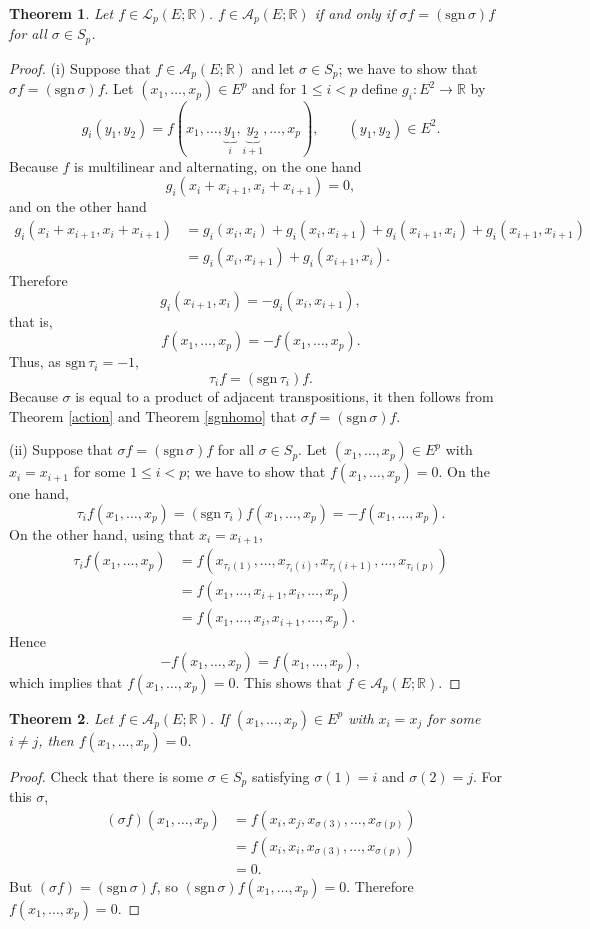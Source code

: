\documentclass{amsart}
\newcommand{\sgn}{\mathrm{sgn}\,}
\newtheorem{theorem}{Theorem}
\theoremstyle{definition}
\begin{document}
\begin{theorem}
Let $f \in \mathscr{L}_p(E;\mathbb{R})$. $f \in \mathscr{A}_p(E;\mathbb{R})$ if and only if $\sigma f = (\sgn \sigma) f$ for all
$\sigma \in S_p$.
\label{sgnalternating}
\end{theorem}
\begin{proof}
(i) Suppose that $f \in \mathscr{A}_p(E;\mathbb{R})$ and let $\sigma \in S_p$; we have to show that $\sigma f = (\sgn \sigma) f$. 
Let $(x_1,\ldots,x_p) \in E^p$ and for $1 \leq i < p$ define $g_i:E^2 \to \mathbb{R}$ by
\[
g_i(y_1,y_2) = f(x_1,\ldots,\underbrace{y_1}_i,\underbrace{y_2}_{i+1},\ldots,x_p),
\qquad (y_1,y_2) \in E^2.
\]
Because $f$ is multilinear and alternating, on the one hand
\[
g_i(x_i+x_{i+1},x_i+x_{i+1}) = 0,
\]
and on the other hand
\begin{align*}
g_i(x_i+x_{i+1},x_i+x_{i+1})&=g_i(x_i,x_i)+g_i(x_i,x_{i+1})+
g_i(x_{i+1},x_i)+g_i(x_{i+1},x_{i+1})\\
&=g_i(x_i,x_{i+1})+
g_i(x_{i+1},x_i).
\end{align*} 
Therefore
\[
g_i(x_{i+1},x_i) = -g_i(x_i,x_{i+1}),
\]
that is,
\[
f(x_1,\ldots,x_p) = -f(x_1,\ldots,x_p).
\]
Thus, as $\sgn \tau_i=-1$,
\[
\tau_i f = (\sgn \tau_i) f.
\]
Because $\sigma$ is equal to a product of adjacent transpositions, it then follows from Theorem \ref{action} and
Theorem \ref{sgnhomo} that 
$\sigma f = (\sgn \sigma) f$. 

(ii) Suppose that $\sigma f = (\sgn \sigma) f$ for all $\sigma \in S_p$. 
Let $(x_1,\ldots,x_p) \in E^p$ with $x_i=x_{i+1}$ for some $1 \leq i < p$; we have
to show that $f(x_1,\ldots,x_p)=0$.
On the one hand,
\[
\tau_i f(x_1,\ldots,x_p) = (\sgn \tau_i) f(x_1,\ldots,x_p) = -f(x_1,\ldots,x_p).
\]
On the other hand, using that $x_i=x_{i+1}$,
\begin{align*}
\tau_i f(x_1,\ldots,x_p) &= f(x_{\tau_i(1)},\ldots,x_{\tau_i(i)},
x_{\tau_i(i+1)},\ldots,x_{\tau_i(p)})\\
&=f(x_1,\ldots,x_{i+1},x_i,\ldots,x_p)\\
&=f(x_1,\ldots,x_i,x_{i+1},\ldots,x_p).
\end{align*}
Hence
\[
-f(x_1,\ldots,x_p) = f(x_1,\ldots,x_p),
\]
which implies that $f(x_1,\ldots,x_p)=0$. This shows that $f \in \mathscr{A}_p(E;\mathbb{R})$.
\end{proof}

\begin{theorem}
Let $f \in \mathscr{A}_p(E;\mathbb{R})$. If
$(x_1,\ldots,x_p) \in E^p$ with $x_i=x_j$ for some $i \neq j$, then
$f(x_1,\ldots,x_p) = 0$.
\label{transposition}
\end{theorem}
\begin{proof}
Check that there is some $\sigma \in S_p$ satisfying $\sigma(1)=i$ and $\sigma(2)=j$.
For this $\sigma$,
\begin{align*}
(\sigma f)(x_1,\ldots,x_p) &=f(x_i,x_j,x_{\sigma(3)},\ldots,x_{\sigma(p)})\\
&=f(x_i,x_i,x_{\sigma(3)},\ldots,x_{\sigma(p)})\\
&=0.
\end{align*}
But $(\sigma f) = (\sgn \sigma) f$, so $(\sgn \sigma) f(x_1,\ldots,x_p) = 0$. Therefore
$f(x_1,\ldots,x_p)=0$.
\end{proof}
\end{document}
